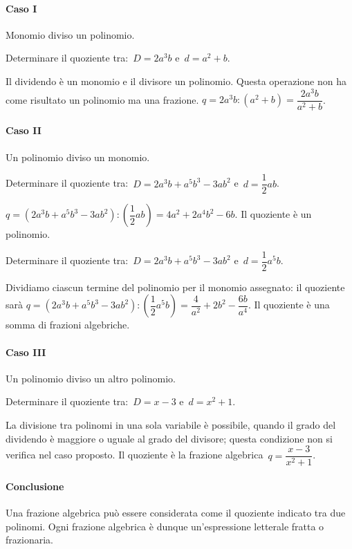 \paragraph{Caso I }Monomio diviso un polinomio.
\begin{itemize*}
 \item Determinare il quoziente tra:~$D=2a^{3}b$ e~$d=a^{2}+b$.
\end{itemize*}
Il dividendo è un monomio e il divisore un polinomio.
Questa operazione non ha come risultato un polinomio ma una
frazione. $q=2a^{3}b:\left(a^{2}+b\right)=\dfrac{2a^{3}b}{a^{2}+b}$.
\pagebreak
\paragraph{Caso II}Un polinomio diviso un monomio.
\begin{itemize*}
 \item Determinare il quoziente tra:~$D=2a^{3}b+a^{5}b^{3}-3ab^{2}$ e~$d=\dfrac{1}{2}ab$.
\end{itemize*}
$q=\left(2a^{3}b+a^{5}b^{3}-3ab^{2}\right):\left(\dfrac{1}{2}ab\right)=4a^{2}+2a^{4}b^{2}-6b$.
Il quoziente è un polinomio.
\begin{itemize*}
 \item Determinare il quoziente tra:~$D=2a^{3}b+a^{5}b^{3}-3ab^{2}$ e~$d=\dfrac{1}{2}a^{5}b$.
\end{itemize*}
Dividiamo ciascun termine del polinomio per il monomio assegnato: il quoziente sarà
$q=\left(2a^{3}b+a^{5}b^{3}-3ab^{2}\right):\left(\dfrac{1}{2}a^{5}b\right)=\dfrac{4}{a^{2}}+2b^{2}-\dfrac{6b}{a^{4}}$.
Il quoziente è una somma di frazioni algebriche.

\paragraph{Caso III}Un polinomio diviso un altro polinomio.
\begin{itemize*}
 \item Determinare il quoziente tra:~$D=x-3$ e~$d=x^{2}+1$.
\end{itemize*}
La divisione tra polinomi in una sola variabile è possibile, quando il grado del dividendo è maggiore o uguale al grado del divisore;
questa condizione non si verifica nel caso proposto.
Il quoziente è la frazione algebrica~$q=\dfrac{x-3}{x^{2}+1}$.

\paragraph{Conclusione}Una frazione algebrica può essere considerata come il quoziente indicato tra due polinomi.
Ogni frazione algebrica è dunque un'espressione letterale fratta o frazionaria.

